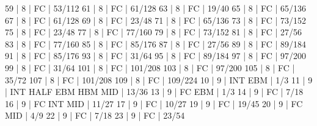 59    |  8     |    FC                                        | 53/112   
61    |  8     |    FC                                        | 61/128   
63    |  8     |    FC                                        | 19/40   
65    |  8     |    FC                                        | 65/136   
67    |  8     |    FC                                        | 61/128   
69    |  8     |    FC                                        | 23/48   
71    |  8     |    FC                                        | 65/136   
73    |  8     |    FC                                        | 73/152   
75    |  8     |    FC                                        | 23/48   
77    |  8     |    FC                                        | 77/160   
79    |  8     |    FC                                        | 73/152   
81    |  8     |    FC                                        | 27/56   
83    |  8     |    FC                                        | 77/160   
85    |  8     |    FC                                        | 85/176   
87    |  8     |    FC                                        | 27/56   
89    |  8     |    FC                                        | 89/184   
91    |  8     |    FC                                        | 85/176   
93    |  8     |    FC                                        | 31/64   
95    |  8     |    FC                                        | 89/184   
97    |  8     |    FC                                        | 97/200   
99    |  8     |    FC                                        | 31/64   
101   |  8     |    FC                                        | 101/208   
103   |  8     |    FC                                        | 97/200   
105   |  8     |    FC                                        | 35/72   
107   |  8     |    FC                                        | 101/208   
109   |  8     |    FC                                        | 109/224   
10    |  9     |        INT        EBM                        | 1/3   
11    |  9     |        INT  HALF  EBM  HBM  MID              | 13/36   
13    |  9     |    FC             EBM                        | 1/3   
14    |  9     |    FC                                        | 7/18   
16    |  9     |    FC  INT                  MID              | 11/27   
17    |  9     |    FC                                        | 10/27   
19    |  9     |    FC                                        | 19/45   
20    |  9     |    FC                       MID              | 4/9   
22    |  9     |    FC                                        | 7/18   
23    |  9     |    FC                                        | 23/54   
